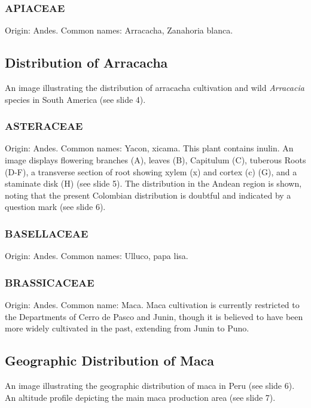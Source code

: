 \subsubsection*{APIACEAE} 
Origin: Andes. Common names: Arracacha, Zanahoria blanca.

\subsection{Distribution of Arracacha} 
An image illustrating the distribution of arracacha cultivation and wild \textit{Arracacia} species in South America (see slide 4).

\subsubsection*{ASTERACEAE} 
Origin: Andes. Common names: Yacon, xicama. This plant contains inulin. An image displays flowering branches (A), leaves (B), Capitulum (C), tuberous Roots (D-F), a transverse section of root showing xylem (x) and cortex (c) (G), and a staminate disk (H) (see slide 5). The distribution in the Andean region is shown, noting that the present Colombian distribution is doubtful and indicated by a question mark (see slide 6).

\subsubsection*{BASELLACEAE} 
Origin: Andes. Common names: Ulluco, papa lisa.

\subsubsection*{BRASSICACEAE} 
Origin: Andes. Common name: Maca. Maca cultivation is currently restricted to the Departments of Cerro de Pasco and Junin, though it is believed to have been more widely cultivated in the past, extending from Junin to Puno.

\subsection{Geographic Distribution of Maca} 
An image illustrating the geographic distribution of maca in Peru (see slide 6). An altitude profile depicting the main maca production area (see slide 7).

